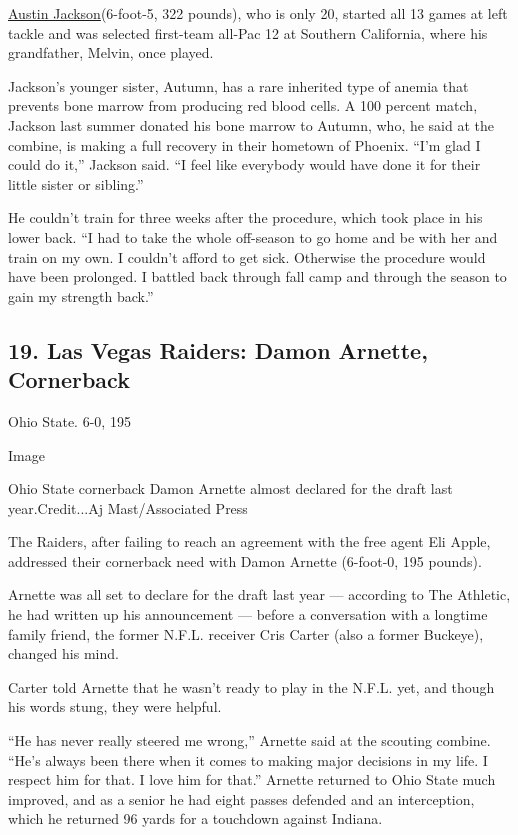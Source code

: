 \href{https://www.nytimes3xbfgragh.onion/article/austin-jackson.html}{Austin
Jackson}(6-foot-5, 322 pounds), who is only 20, started all 13 games at
left tackle and was selected first-team all-Pac 12 at Southern
California, where his grandfather, Melvin, once played.

Jackson's younger sister, Autumn, has a rare inherited type of anemia
that prevents bone marrow from producing red blood cells. A 100 percent
match, Jackson last summer donated his bone marrow to Autumn, who, he
said at the combine, is making a full recovery in their hometown of
Phoenix. ``I'm glad I could do it,'' Jackson said. ``I feel like
everybody would have done it for their little sister or sibling.''

He couldn't train for three weeks after the procedure, which took place
in his lower back. ``I had to take the whole off-season to go home and
be with her and train on my own. I couldn't afford to get sick.
Otherwise the procedure would have been prolonged. I battled back
through fall camp and through the season to gain my strength back.''

\hypertarget{19-las-vegas-raiders-damon-arnette-cornerback}{%
\subsection{19. Las Vegas Raiders: Damon Arnette,
Cornerback}\label{19-las-vegas-raiders-damon-arnette-cornerback}}

Ohio State. 6-0, 195

Image

Ohio State cornerback Damon Arnette almost declared for the draft last
year.Credit...Aj Mast/Associated Press

The Raiders, after failing to reach an agreement with the free agent Eli
Apple, addressed their cornerback need with Damon Arnette (6-foot-0, 195
pounds).

Arnette was all set to declare for the draft last year --- according to
The Athletic, he had written up his announcement --- before a
conversation with a longtime family friend, the former N.F.L. receiver
Cris Carter (also a former Buckeye), changed his mind.

Carter told Arnette that he wasn't ready to play in the N.F.L. yet, and
though his words stung, they were helpful.

``He has never really steered me wrong,'' Arnette said at the scouting
combine. ``He's always been there when it comes to making major
decisions in my life. I respect him for that. I love him for that.''
Arnette returned to Ohio State much improved, and as a senior he had
eight passes defended and an interception, which he returned 96 yards
for a touchdown against Indiana.

